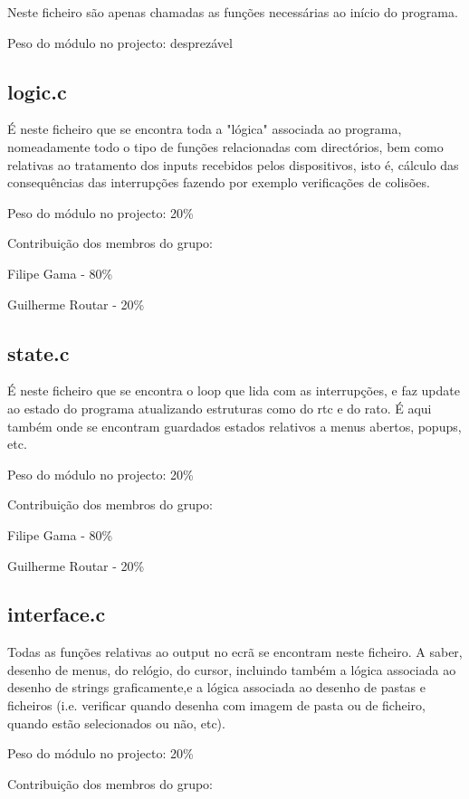 \documentclass[a4paper]{article}
\begin{document}
Neste ficheiro são apenas chamadas as funções necessárias ao início do programa.\bigskip

Peso do módulo no projecto: desprezável 


\subsection{logic.c}

É neste ficheiro que se encontra toda a "lógica" associada ao programa, nomeadamente todo o tipo de funções relacionadas com directórios, bem como relativas ao tratamento dos inputs recebidos pelos dispositivos, isto é, cálculo das consequências das interrupções fazendo por exemplo verificações de colisões.\bigskip

Peso do módulo no projecto: 20\%

Contribuição dos membros do grupo:

Filipe Gama - 80\%

Guilherme Routar - 20\%


\subsection{state.c}

É neste ficheiro que se encontra o loop que lida com as interrupções, e faz update ao estado do programa atualizando estruturas como do rtc e do rato. É aqui também onde se encontram guardados estados relativos a menus abertos, popups, etc. \bigskip

Peso do módulo no projecto: 20\%

Contribuição dos membros do grupo:

Filipe Gama - 80\%

Guilherme Routar - 20\%


\subsection{interface.c} 

Todas as funções relativas ao output no ecrã se encontram neste ficheiro. A saber, desenho de menus, do relógio, do cursor, incluindo também a lógica associada ao desenho de strings graficamente,e a lógica associada ao desenho de pastas e ficheiros (i.e. verificar quando desenha com imagem de pasta ou de ficheiro, quando estão selecionados ou não, etc).\bigskip

Peso do módulo no projecto: 20\%

Contribuição dos membros do grupo:
\end{document}
